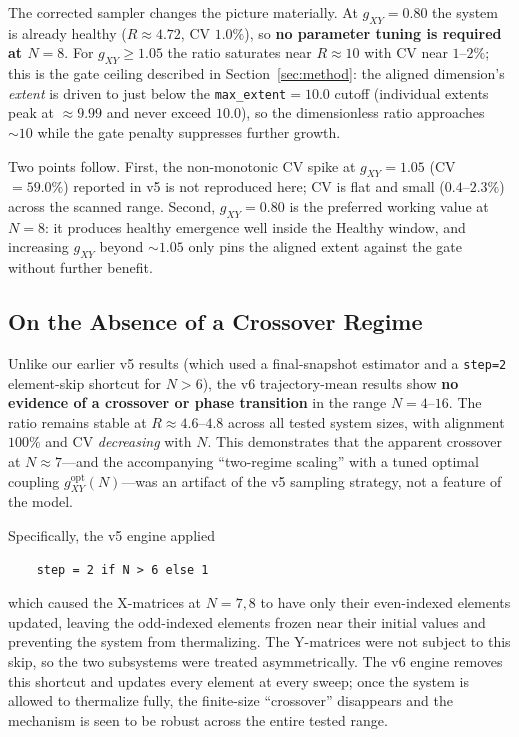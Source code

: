\documentclass[12pt,a4paper]{article}
\begin{document}
The corrected sampler changes the picture materially. At $g_{XY}=0.80$ the
system is already healthy ($R \approx 4.72$, CV $1.0\%$), so \textbf{no
parameter tuning is required at $N=8$}. For $g_{XY} \geq 1.05$ the ratio
saturates near $R \approx 10$ with CV near $1$--$2\%$; this is the gate
ceiling described in Section~\ref{sec:method}: the aligned dimension's
\emph{extent} is driven to just below the \texttt{max\_extent}$=10.0$ cutoff
(individual extents peak at $\approx 9.99$ and never exceed $10.0$), so the
dimensionless ratio approaches $\sim 10$ while the gate penalty suppresses
further growth.

Two points follow. First, the non-monotonic CV spike at $g_{XY}=1.05$
(CV $=59.0\%$) reported in v5 is not reproduced here; CV is flat and small
($0.4$--$2.3\%$) across the scanned range. Second, $g_{XY}=0.80$ is the
preferred working value at $N=8$: it produces healthy emergence well inside
the Healthy window, and increasing $g_{XY}$ beyond $\sim 1.05$ only pins the
aligned extent against the gate without further benefit.

\subsection{On the Absence of a Crossover Regime}\label{sec:absence_crossover}

Unlike our earlier v5 results (which used a final-snapshot estimator and a
\texttt{step=2} element-skip shortcut for $N>6$), the v6 trajectory-mean
results show \textbf{no evidence of a crossover or phase transition} in the
range $N=4$--$16$. The ratio remains stable at $R \approx 4.6$--$4.8$ across
all tested system sizes, with alignment $100\%$ and CV \emph{decreasing} with
$N$. This demonstrates that the apparent crossover at $N \approx 7$---and the
accompanying ``two-regime scaling'' with a tuned optimal coupling
$g_{XY}^{\mathrm{opt}}(N)$---was an artifact of the v5 sampling strategy, not
a feature of the model.

Specifically, the v5 engine applied
\begin{verbatim}
    step = 2 if N > 6 else 1
\end{verbatim}
which caused the X-matrices at $N=7,8$ to have only their even-indexed
elements updated, leaving the odd-indexed elements frozen near their
initial values and preventing the system from thermalizing. The Y-matrices
were not subject to this skip, so the two subsystems were treated
asymmetrically. The v6 engine removes this shortcut and updates every element
at every sweep; once the system is allowed to thermalize fully, the
finite-size ``crossover'' disappears and the mechanism is seen to be robust
across the entire tested range.
\end{document}
